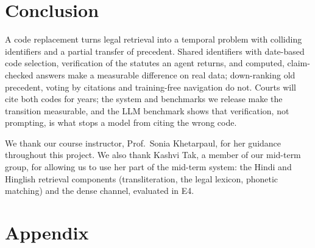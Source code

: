 \documentclass[sigconf,nonacm]{acmart}
\begin{document}
\section{Conclusion}
A code replacement turns legal retrieval into a temporal problem with colliding identifiers and a
partial transfer of precedent. Shared identifiers with date-based code selection, verification of
the statutes an agent returns, and computed, claim-checked answers make a measurable difference on
real data; down-ranking old precedent, voting by citations and training-free navigation do not.
Courts will cite both codes for years; the system and benchmarks we release make the transition
measurable, and the LLM benchmark shows that verification, not prompting, is what stops a model
from citing the wrong code.


\begin{acks}
We thank our course instructor, Prof.\ Sonia Khetarpaul, for her guidance throughout this project.
We also thank Kashvi Tak, a member of our mid-term group, for allowing us to use her part of the
mid-term system: the Hindi and Hinglish retrieval components (transliteration, the legal lexicon,
phonetic matching) and the dense channel, evaluated in E4.
\end{acks}




\appendix
\section*{Appendix}
\end{document}
